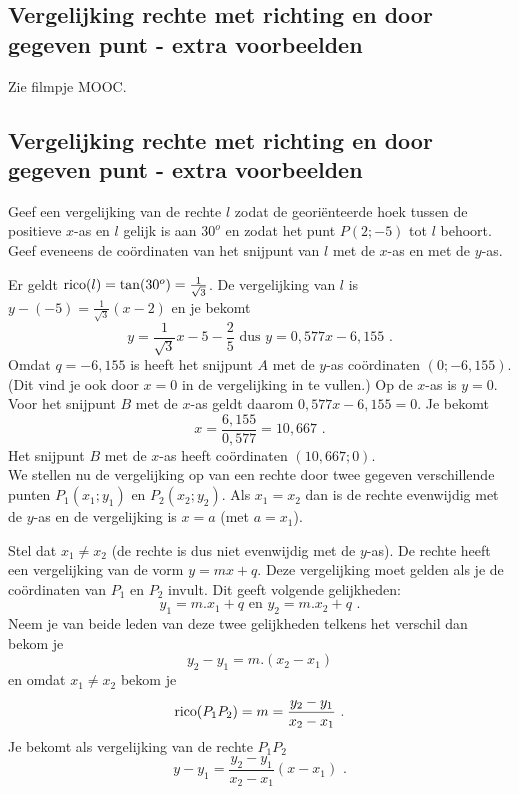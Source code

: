 \subsection{Vergelijking rechte met richting en door gegeven punt - extra voorbeelden}
Zie filmpje MOOC.

\subsection{Vergelijking rechte met richting en door gegeven punt - extra voorbeelden}

\begin{voorbeeld}
Geef een vergelijking van de rechte $l$ zodat de geori\"enteerde hoek tussen de positieve $x$-as en $l$ gelijk is aan $30^o$ en zodat het punt $P(2;-5)$ tot  $l$ behoort.
Geef eveneens de co\"ordinaten van het snijpunt van $l$ met de $x$-as en met de $y$-as.



Er geldt $\operatorname{rico} (l)=\tan (30^o)=\frac {1}{\sqrt{3}}$.
De vergelijking van $l$ is $y-(-5)=\frac{1}{\sqrt{3}}(x-2)$ en je bekomt
\[
y=\frac{1}{\sqrt{3}}x-5-\frac{2}{5} \text { dus } y=0,577x-6,155 \text { .}
\]
Omdat $q=-6,155$ is heeft het snijpunt $A$ met de $y$-as co\"ordinaten $(0;-6,155)$.
(Dit vind je ook door $x=0$ in de vergelijking in te vullen.)
Op de $x$-as is $y=0$. Voor het snijpunt $B$ met de $x$-as geldt daarom $0,577x-6,155=0$.
Je bekomt
\[
x=\frac{6,155}{0,577}=10,667 \text { .}
\]
Het snijpunt $B$ met de $x$-as heeft co\"ordinaten $(10,667;0)$.\\

We stellen nu de vergelijking op van een rechte door twee gegeven verschillende punten $P_1(x_1;y_1)$ en $P_2(x_2;y_2)$.
Als $x_1=x_2$ dan is de rechte evenwijdig met de $y$-as en de vergelijking is $x=a$ (met $a=x_1$).

Stel dat $x_1 \neq x_2$ (de rechte is dus niet evenwijdig met de $y$-as).
De rechte heeft een vergelijking van de vorm $y=mx+q$.
Deze vergelijking moet gelden als je de co\"ordinaten van $P_1$ en $P_2$ invult.
Dit geeft volgende gelijkheden:
\[
y_1=m.x_1+q \text { en } y_2=m.x_2+q \text { .}
\]
Neem je van beide leden van deze twee gelijkheden telkens het verschil dan bekom je
\[
y_2-y_1=m.(x_2-x_1) 
\]
en omdat $x_1 \neq x_2$ bekom je
\[
\operatorname{rico} (P_1P_2)=m=\frac {y_2-y_1}{x_2-x_1} \text { .}
\]
Je bekomt als vergelijking van de rechte $P_1P_2$
\[
y-y_1=\frac {y_2-y_1}{x_2-x_1} (x-x_1) \text { .}
\]\\

\end{voorbeeld}


